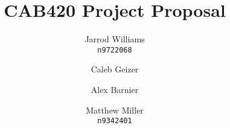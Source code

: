 \documentclass[]{report}   %
\begin{document}
\title{CAB420 Project Proposal}   %
\author{
	Jarrod Williams\\
	\texttt{n9722068}
	\and 
	Caleb Geizer\\
	\texttt{}
	\and
	Alex Barnier\\
	\texttt{}
	\and	
	Matthew Miller\\
	\texttt{n9342401}
}
\maketitle
\end{document}
